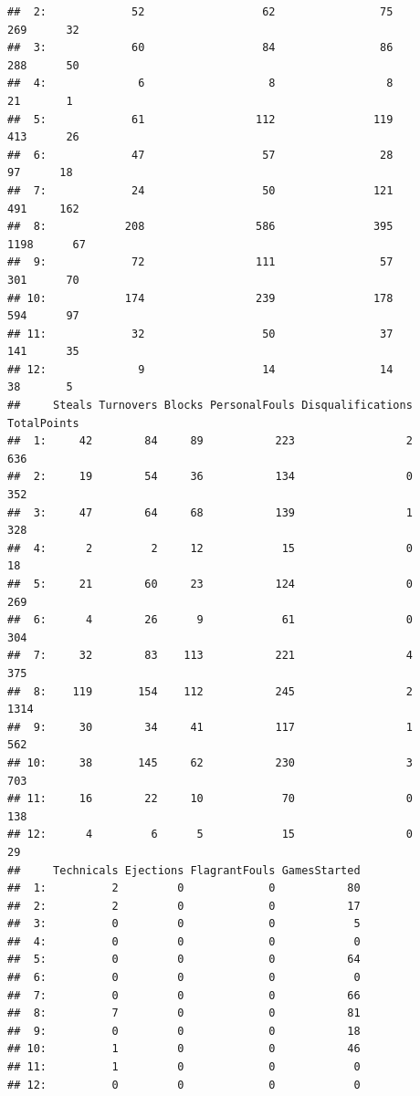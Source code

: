 \documentclass[]{book}
\theoremstyle{definition}
\theoremstyle{definition}
\theoremstyle{remark}
\begin{document}
\begin{verbatim}
##  2:             52                  62                75           269      32
##  3:             60                  84                86           288      50
##  4:              6                   8                 8            21       1
##  5:             61                 112               119           413      26
##  6:             47                  57                28            97      18
##  7:             24                  50               121           491     162
##  8:            208                 586               395          1198      67
##  9:             72                 111                57           301      70
## 10:            174                 239               178           594      97
## 11:             32                  50                37           141      35
## 12:              9                  14                14            38       5
##     Steals Turnovers Blocks PersonalFouls Disqualifications TotalPoints
##  1:     42        84     89           223                 2         636
##  2:     19        54     36           134                 0         352
##  3:     47        64     68           139                 1         328
##  4:      2         2     12            15                 0          18
##  5:     21        60     23           124                 0         269
##  6:      4        26      9            61                 0         304
##  7:     32        83    113           221                 4         375
##  8:    119       154    112           245                 2        1314
##  9:     30        34     41           117                 1         562
## 10:     38       145     62           230                 3         703
## 11:     16        22     10            70                 0         138
## 12:      4         6      5            15                 0          29
##     Technicals Ejections FlagrantFouls GamesStarted
##  1:          2         0             0           80
##  2:          2         0             0           17
##  3:          0         0             0            5
##  4:          0         0             0            0
##  5:          0         0             0           64
##  6:          0         0             0            0
##  7:          0         0             0           66
##  8:          7         0             0           81
##  9:          0         0             0           18
## 10:          1         0             0           46
## 11:          1         0             0            0
## 12:          0         0             0            0
\end{verbatim}
\end{document}

